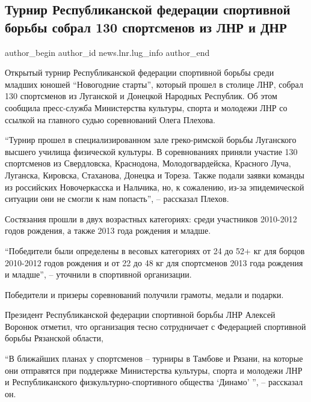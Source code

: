  
 
 
 
 
 
\subsection{Турнир Республиканской федерации спортивной борьбы собрал 130 спортсменов из ЛНР и ДНР}
\label{sec:26_01_2022.stz.news.lnr.lug_info.1.turnir_sportivnaja_borjba}
 
\ifcmt
 author_begin
   author_id news.lnr.lug_info
 author_end
\fi

Открытый турнир Республиканской федерации спортивной борьбы среди младших
юношей \enquote{Новогодние старты}, который прошел в столице ЛНР, собрал 130
спортсменов из Луганской и Донецкой Народных Республик. Об этом сообщила
пресс-служба Министерства культуры, спорта и молодежи ЛНР со ссылкой на
главного судью соревнований Олега Плехова.


\enquote{Турнир прошел в специализированном зале греко-римской борьбы Луганского
высшего училища физической культуры. В соревнованиях приняли участие 130
спортсменов из Свердловска, Краснодона, Молодогвардейска, Красного Луча,
Луганска, Кировска, Стаханова, Донецка и Тореза. Также подали заявки команды из
российских Новочеркасска и Нальчика, но, к сожалению, из-за эпидемической
ситуации они не смогли к нам попасть}, – рассказал Плехов.


Состязания прошли в двух возрастных категориях: среди участников 2010-2012
годов рождения, а также 2013 года рождения и младше.

\enquote{Победители были определены в весовых категориях от 24 до 52+ кг для борцов
2010-2012 годов рождения и от 22 до 48 кг для спортсменов 2013 года рождения и
младше}, – уточнили в спортивной организации.

Победители и призеры соревнований получили грамоты, медали и подарки.

Президент Республиканской федерации спортивной борьбы ЛНР Алексей Воронюк
отметил, что организация тесно сотрудничает с Федерацией спортивной борьбы
Рязанской области,

\enquote{В ближайших планах у спортсменов – турниры в Тамбове и Рязани, на
которые они отправятся при поддержке Министерства культуры, спорта и молодежи
ЛНР и Республиканского физкультурно-спортивного общества \enquote{Динамо} }, –
рассказал он. 
